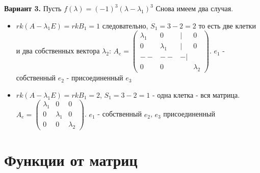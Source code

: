 \textbf{Вариант 3.} Пусть $f(\lambda)=(-1)^3(\lambda-\lambda_1)^3$
Снова имеем два случая. 
\begin{itemize}
    \item $rk(A-\lambda_1E)=rkB_1=1$ следовательно, $S_1=3-2=2$ то есть две
			клетки и два собственных вектора  $\lambda_2$: $A_e=\begin{pmatrix}
			\lambda_1&0&|&0\\0&\lambda_1&|&0\\--&--&-|&\\0&0&&\boxed{\lambda_2}
	\end{pmatrix}$. 
    $e_1$ - собственный  $e_2$ - присоединенный $e_3$ 
    \item $rk(A-\lambda_1E)=rkB_1=2$, $S_1=3-2=1$ - одна клетка - вся матрица.
			$A_e=\begin{pmatrix}\lambda_1&0&0\\0&\lambda_1&0\\0&0&\lambda_2
			\end{pmatrix}$. $e_1$ - собственный $e_2$, $e_3$ присоединенный
\end{itemize}
 
\newpage
\section{Функции от матриц}
